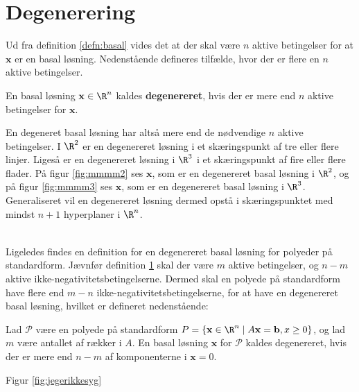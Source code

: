 \section{Degenerering}
Ud fra definition \ref{defn:basal} vides det at der skal være $n$ aktive betingelser for at $\mathbf{x}$ er en basal løsning. 
Nedenstående defineres tilfælde, hvor der er flere en $n$ aktive betingelser. 
%
\begin{defn}{}{}
En basal løsning $\mathbf{x} \in \R^n$ kaldes \textbf{degenereret}, hvis der er mere end $n$ aktive betingelser for $\mathbf{x}$.
\end{defn}
\noindent
%
En degeneret basal løsning har altså mere end de nødvendige $n$ aktive betingelser.
% 
I $\R^2$ er en degenereret løsning i et skæringspunkt af tre eller flere linjer. 
Ligeså er en degenereret løsning i $\R^3$ i et skæringspunkt af fire eller flere flader. 
På figur \ref{fig:mmmm2} ses $\mathbf{x}$, som er en degenereret basal løsning i $\R^2$, og på figur  \ref{fig:mmmm3} ses $\mathbf{x}$, som er en degenereret basal løsning i $\R^3$.
Generaliseret vil en degenereret løsning dermed opstå i skæringspunktet med mindst $n+1$ hyperplaner i $\R^n$.
%
%
\begin{center}
$
\begin{array}{cc}
&

\end{array}
$
\end{center}
%
%
Ligeledes findes en definition for en degenereret basal løsning for polyeder på standardform. 
Jævnfør definition \ref{} skal der være $m$ aktive betingelser, og $n-m$ aktive ikke-negativitetsbetingelserne. Dermed skal en polyede på standardform have flere end $m-n$ ikke-negativitetsbetingelserne, for at have en degenereret basal løsning, hvilket er defineret nedenstående:
%
\begin{defn}{}{}
Lad $\mathcal{P}$ være en polyede på standardform
$P=\{ \mathbf{x} \in \R^n \mid A\mathbf{x}=\mathbf{b},x \geq 0 \}$, og lad $m$ være antallet af rækker i $A$.
En basal løsning $\mathbf{x}$ for $\mathcal{P}$ kaldes degenereret, hvis der er mere end $n-m$ af komponenterne i $\mathbf{x}=0$.
\end{defn}
\noindent
%
%
%
Figur \ref{fig:jegerikkesyg}
%
%

%











